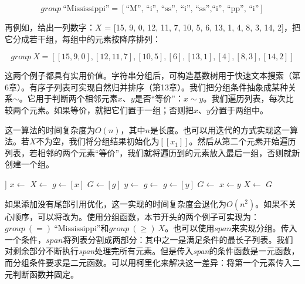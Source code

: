 \documentclass[b5paper]{ctexart}
\begin{document}
\[
\textit{group}\ \text{``Mississippi''} = [\text{``M'', ``i'', ``ss'', ``i'', ``ss'',``i'', ``pp'', ``i''}]
\]

再例如，给出一列数字：$X$ = [15, 9, 0, 12, 11, 7, 10, 5, 6, 13, 1, 4, 8, 3, 14, 2]，把它分成若干组，每组中的元素按降序排列：

\[
\textit{group}\ X = [[15, 9, 0], [12, 11, 7], [10, 5], [6], [13, 1], [4], [8, 3], [14, 2]]
\]

这两个例子都具有实用价值。字符串分组后，可构造基数树用于快速文本搜索（第6章）。有序子列表可实现自然归并排序（第13章）。我们把分组条件抽象成某种关系$\sim$。它用于判断两个相邻元素$x$、$y$是否“等价”：$x \sim y$。我们遍历列表，每次比较两个元素。如果等价，就把它们置于一组；否则把$x$、$y$分置于两组中。

\be
{}
\ee

这一算法的时间复杂度为$O(n)$，其中$n$是长度。也可以用迭代的方式实现这一算法。若$X$不为空，我们将分组结果初始化为$[[x_1]]$。然后从第二个元素开始遍历列表，若相邻的两个元素“等价”，我们就将遍历到的元素放入最后一组，否则就新创建一个组。

\begin{algorithmic}[1]
    \State \Return [[\ ]]
  \EndIf
  \State $x \gets$ 
  \State $X \gets$ 
  \State $g \gets [x]$
  \State $G \gets [g]$
    \State $y \gets$ 
      \State $g \gets $ 
    \Else
      \State $g \gets [y]$
      \State $G \gets$ 
    \EndIf
    \State $x \gets y$
    \State $X \gets$ 
  \EndWhile
  \State \Return $G$
\EndFunction
\end{algorithmic}

如果添加没有尾部引用优化，这一实现的时间复杂度会退化为$O(n^2)$。如果不关心顺序，可以将改为。使用分组函数，本节开头的两个例子可实现为：$\textit{group}\ (=)\ \text{``Mississippi''}$和$\textit{group}\ (\geq)\ X$。也可以使用$span$来实现分组。传入一个条件，$span$将列表分割成两部分：其中之一是满足条件的最长子列表。我们对剩余部分不断执行\textit{span}处理完所有元素。但是传入\textit{span}的条件函数是一元函数，而分组条件要求是二元函数。可以用柯里化来解决这一差异：将第一个元素传入二元判断函数并固定。
\end{document}
